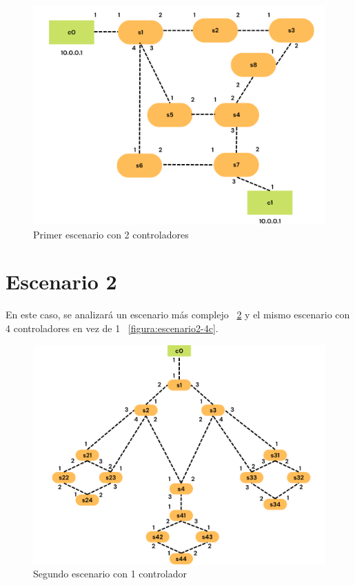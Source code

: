 \documentclass[a4paper, 12pt]{book}
\begin{document}
 	\begin{figure}[H]
 		\centering
 		\includegraphics[width=16cm, keepaspectratio]{img/escenario1-2}
 		\caption{Primer escenario con 2 controladores}
 		\label{figura:escenario1-2c}
 	\end{figure}
 	
 	
 	\section{Escenario 2}
 	
 	En este caso, se analizará un escenario más complejo ~\ref{figura:escenario2-1c} y el mismo escenario con 4 controladores en vez de 1 ~\ref{figura:escenario2-4c}.
 	
 	\begin{figure}[H]
 		\centering
 		\includegraphics[width=16cm, keepaspectratio]{img/escenario2-1}
 		\caption{Segundo escenario con 1 controlador}
 		\label{figura:escenario2-1c}
 	\end{figure}
 	
\end{document}
